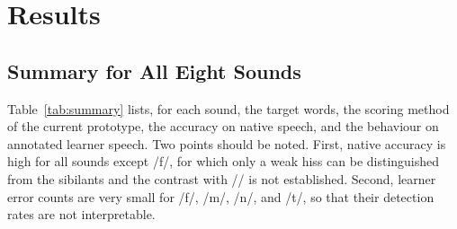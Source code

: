 \documentclass[conference]{IEEEtran}
\newcommand{\ipa}[1]{/#1/}
\begin{document}
\section{Results}
\subsection{Summary for All Eight Sounds}
Table~\ref{tab:summary} lists, for each sound, the target words, the scoring method of the current prototype, the accuracy on native speech, and the behaviour on annotated learner speech. Two points should be noted. First, native accuracy is high for all sounds except \ipa{f}, for which only a weak hiss can be distinguished from the sibilants and the contrast with \ipa{\texttheta} is not established. Second, learner error counts are very small for \ipa{f}, \ipa{m}, \ipa{n}, and \ipa{t\textesh}, so that their detection rates are not interpretable.
\end{document}
